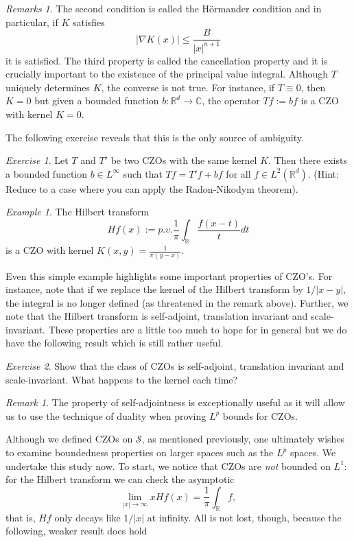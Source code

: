 \documentclass[11pt]{article}
\theoremstyle{remark}
\newtheorem{exr}{Exercise}
\newtheorem*{ex}{Example}
\newtheorem*{rmk}{Remark}
\newtheorem*{rmks}{Remarks}
\newcommand{\calS}{\mathcal{S}}
\newcommand{\1}{\textbf{1}}
\newcommand{\bbR}{\mathbb{R}}
\newcommand{\bbC}{\mathbb{C}}
\begin{document}
\begin{rmks}
The second condition is called the H\"ormander condition and in particular, if $K$ satisfies
\[
|\nabla K(x)| \leq \frac{B}{|x|^{n+1}}
\]
it is satisfied. The third property is called the cancellation property and it is crucially important to the existence of the principal value integral.
Although $T$ uniquely determines $K$, the converse is not true. For instance, if $T \equiv 0$, then $K = 0$ but given a bounded function $b : \mathbb{R}^d \to \bbC$, the operator $Tf := bf$ is a CZO with kernel $K = 0$. 
\end{rmks}
The following exercise reveals that this is the only source of ambiguity.
\begin{exr}
Let $T$ and $T'$ be two CZOs with the same kernel $K$. Then there exists a bounded function $b \in L^\infty$ such that $Tf = T'f + bf$ for all $f \in L^2(\bbR^d)$. (Hint: Reduce to a case where you can apply the Radon-Nikodym theorem).
\end{exr}
\begin{ex}
The Hilbert transform
\[
Hf(x) := p.v. \frac{1}{\pi} \int_{\bbR} \frac{f(x-t)}{t} dt
\]
is a CZO with kernel $K(x,y) = \frac{1}{\pi(y-x)}$.
\end{ex}
Even this simple example highlights some important properties of CZO's. For instance, note that if we replace the kernel of the Hilbert transform by $1/|x-y|$, the integral is no longer defined (as threatened in the remark above). Further, we note that the Hilbert transform is self-adjoint, translation invariant and scale-invariant. These properties are a little too much to hope for in general but we do have the following result which is still rather useful.
\begin{exr}
Show that the class of CZOs is self-adjoint, translation invariant and scale-invariant. What happens to the kernel each time?
\end{exr}
\begin{rmk}
The property of self-adjointness is exceptionally useful as it will allow us to use the technique of duality when proving $L^p$ bounds for CZOs.
\end{rmk}
Although we defined CZOs on $\calS$, as mentioned previously, one ultimately wishes to examine boundedness properties on larger spaces such as the $L^p$ spaces. We undertake this study now. To start, we notice that CZOs are \emph{not} bounded on $L^1$: for the Hilbert transform we can check the asymptotic
\[
\lim_{|x| \to \infty} x Hf(x) = \frac{1}{\pi} \int_{\mathbb{R}} f,
\]
that is, $Hf$ only decays like $1/|x|$ at infinity. All is not lost, though, because the following,  weaker result does hold
\end{document}
